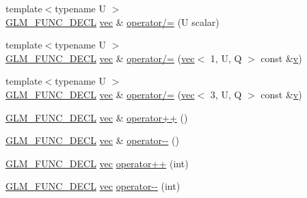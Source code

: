 \begin{DoxyCompactItemize}
\item 
{\footnotesize template$<$typename U $>$ }\\\mbox{\hyperlink{setup_8hpp_ab2d052de21a70539923e9bcbf6e83a51}{G\+L\+M\+\_\+\+F\+U\+N\+C\+\_\+\+D\+E\+CL}} \mbox{\hyperlink{structglm_1_1vec}{vec}} \& \mbox{\hyperlink{structglm_1_1vec_3_013_00_01_t_00_01_q_01_4_aa4bc81071af6afd97fa02aabcb50d30a}{operator/=}} (U scalar)
\item 
{\footnotesize template$<$typename U $>$ }\\\mbox{\hyperlink{setup_8hpp_ab2d052de21a70539923e9bcbf6e83a51}{G\+L\+M\+\_\+\+F\+U\+N\+C\+\_\+\+D\+E\+CL}} \mbox{\hyperlink{structglm_1_1vec}{vec}} \& \mbox{\hyperlink{structglm_1_1vec_3_013_00_01_t_00_01_q_01_4_a99545518c14ab942bec2a08acd578352}{operator/=}} (\mbox{\hyperlink{structglm_1_1vec}{vec}}$<$ 1, U, Q $>$ const \&\mbox{\hyperlink{_s_d_l__opengl_8h_a10a82eabcb59d2fcd74acee063775f90}{v}})
\item 
{\footnotesize template$<$typename U $>$ }\\\mbox{\hyperlink{setup_8hpp_ab2d052de21a70539923e9bcbf6e83a51}{G\+L\+M\+\_\+\+F\+U\+N\+C\+\_\+\+D\+E\+CL}} \mbox{\hyperlink{structglm_1_1vec}{vec}} \& \mbox{\hyperlink{structglm_1_1vec_3_013_00_01_t_00_01_q_01_4_ab0b3e69d8f5ae4e3a43203c29c1b9918}{operator/=}} (\mbox{\hyperlink{structglm_1_1vec}{vec}}$<$ 3, U, Q $>$ const \&\mbox{\hyperlink{_s_d_l__opengl_8h_a10a82eabcb59d2fcd74acee063775f90}{v}})
\item 
\mbox{\hyperlink{setup_8hpp_ab2d052de21a70539923e9bcbf6e83a51}{G\+L\+M\+\_\+\+F\+U\+N\+C\+\_\+\+D\+E\+CL}} \mbox{\hyperlink{structglm_1_1vec}{vec}} \& \mbox{\hyperlink{structglm_1_1vec_3_013_00_01_t_00_01_q_01_4_a5815270bfae62e24ed90c95b1054cd9d}{operator++}} ()
\item 
\mbox{\hyperlink{setup_8hpp_ab2d052de21a70539923e9bcbf6e83a51}{G\+L\+M\+\_\+\+F\+U\+N\+C\+\_\+\+D\+E\+CL}} \mbox{\hyperlink{structglm_1_1vec}{vec}} \& \mbox{\hyperlink{structglm_1_1vec_3_013_00_01_t_00_01_q_01_4_a7a914447d1121cc6aa1641280f397d95}{operator-\/-\/}} ()
\item 
\mbox{\hyperlink{setup_8hpp_ab2d052de21a70539923e9bcbf6e83a51}{G\+L\+M\+\_\+\+F\+U\+N\+C\+\_\+\+D\+E\+CL}} \mbox{\hyperlink{structglm_1_1vec}{vec}} \mbox{\hyperlink{structglm_1_1vec_3_013_00_01_t_00_01_q_01_4_acdb71d342fb424b32ea13d9ab2fd11b8}{operator++}} (int)
\item 
\mbox{\hyperlink{setup_8hpp_ab2d052de21a70539923e9bcbf6e83a51}{G\+L\+M\+\_\+\+F\+U\+N\+C\+\_\+\+D\+E\+CL}} \mbox{\hyperlink{structglm_1_1vec}{vec}} \mbox{\hyperlink{structglm_1_1vec_3_013_00_01_t_00_01_q_01_4_a1a93cbd62e3ce16b183ec1ba135e7c70}{operator-\/-\/}} (int)

\end{DoxyCompactItemize}
